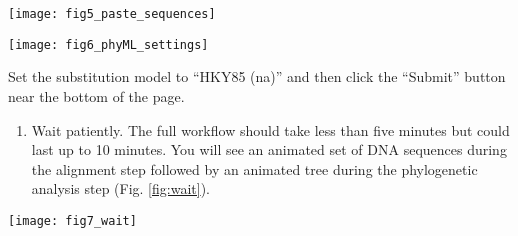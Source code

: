 \documentclass[11pt, addpoints]{exam}
\begin{document}
\newpage

\begin{center}
	\texttt{[image: fig5\_paste\_sequences]}
\end{center}

\vfill

\begin{center}
	\texttt{[image: fig6\_phyML\_settings]}
\end{center}

\noindent Set the substitution model to ``HKY85 (na)'' and then click the ``Submit'' button near the bottom of the
page.


\begin{enumerate}
\item
  Wait patiently. The full workflow should take less than five minutes but could last up to 10 minutes.
  You will see an animated set of DNA sequences during the alignment
  step followed by an animated tree during the phylogenetic analysis
  step (Fig. \ref{fig:wait}).
\end{enumerate}

\begin{center}
	\texttt{[image: fig7\_wait]}
\end{center}
\end{document}
